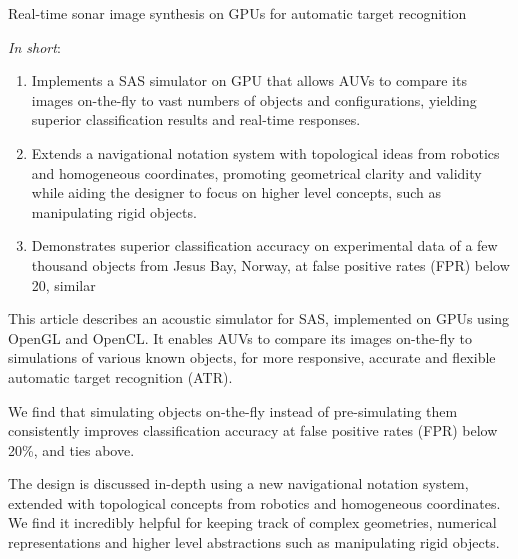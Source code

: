Real-time sonar image synthesis on GPUs for automatic target recognition

\textit{In short}:
\begin{enumerate}
\item Implements a SAS simulator on GPU that allows AUVs to compare its images on-the-fly to vast numbers of objects and configurations, yielding superior classification results and real-time responses.
\item Extends a navigational notation system with topological ideas from robotics and homogeneous coordinates, promoting geometrical clarity and validity while aiding the designer to focus on higher level concepts, such as manipulating rigid objects.
\item Demonstrates superior classification accuracy on experimental data of a few thousand objects from Jesus Bay, Norway, at false positive rates (FPR) below 20, similar %
\end{enumerate}

This article describes an acoustic simulator for SAS, implemented on GPUs using OpenGL and OpenCL. It enables AUVs to compare its images on-the-fly to simulations of various known objects, for more responsive, accurate and flexible automatic target recognition (ATR).

We find that simulating objects on-the-fly instead of pre-simulating them consistently improves classification accuracy at false positive rates (FPR) below 20\%, and ties above. 

The design is discussed in-depth using a new navigational notation system, extended with topological concepts from robotics and homogeneous coordinates. We find it incredibly helpful for keeping track of complex geometries, numerical representations and higher level abstractions such as manipulating rigid objects. 




%
%
%






